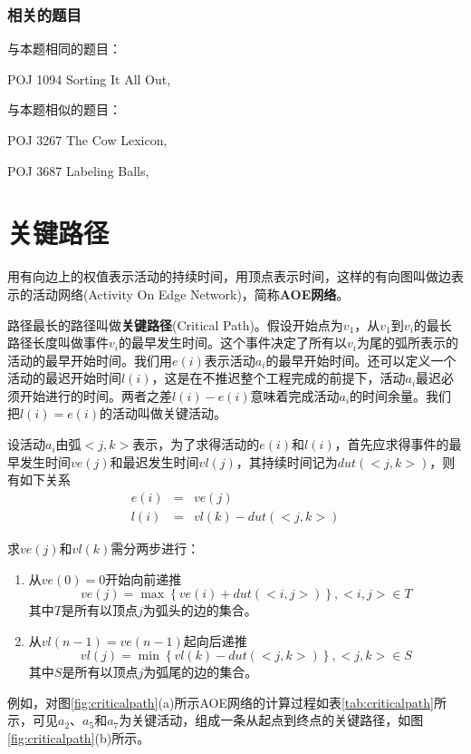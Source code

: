 \subsubsection{相关的题目}
与本题相同的题目：
\begindot
\item POJ 1094 Sorting It All Out, 
\myenddot

与本题相似的题目：
\begindot
\item POJ 3267 The Cow Lexicon, 
\item POJ 3687 Labeling Balls, 
\myenddot


\section{关键路径} %
用有向边上的权值表示活动的持续时间，用顶点表示时间，这样的有向图叫做边表示的活动网络(Activity On Edge Network)，简称\textbf{AOE网络}。

路径最长的路径叫做\textbf{关键路径}(Critical Path)。假设开始点为$v_1$，从$v_1$到$v_i$的最长路径长度叫做事件$v_i$的最早发生时间。这个事件决定了所有以$v_i$为尾的弧所表示的活动的最早开始时间。我们用$e(i)$表示活动$a_i$的最早开始时间。还可以定义一个活动的最迟开始时间$l(i)$，这是在不推迟整个工程完成的前提下，活动$a_i$最迟必须开始进行的时间。两者之差$l(i)-e(i)$意味着完成活动$a_i$的时间余量。我们把$l(i)=e(i)$的活动叫做关键活动。

设活动$a_i$由弧$<j, k>$表示，为了求得活动的$e(i)$和$l(i)$，首先应求得事件的最早发生时间$ve(j)$和最迟发生时间$vl(j)$，其持续时间记为$dut(<j, k>)$，则有如下关系
\begin{eqnarray}
e(i) &=& ve(j) \nonumber \\
l(i) &=& vl(k)-dut(<j, k>) \nonumber
\end{eqnarray}

求$ve(j)$和$vl(k)$需分两步进行：
\begin{enumerate}
\item 从$ve(0)=0$开始向前递推
$$
ve(j)=\max\left\{ve(i)+dut(<i, j>)\right\}, <i, j> \in T
$$
其中$T$是所有以顶点$j$为弧头的边的集合。
\item 从$vl(n-1)=ve(n-1)$起向后递推
$$
vl(j)=\min\left\{vl(k)-dut(<j, k>)\right\}, <j, k> \in S
$$
其中$S$是所有以顶点$j$为弧尾的边的集合。
\end{enumerate}

例如，对图\ref{fig:criticalpath}(a)所示AOE网络的计算过程如表\ref{tab:criticalpath}所示，可见$a_2$、$a_5$和$a_7$为关键活动，组成一条从起点到终点的关键路径，如图\ref{fig:criticalpath}(b)所示。

